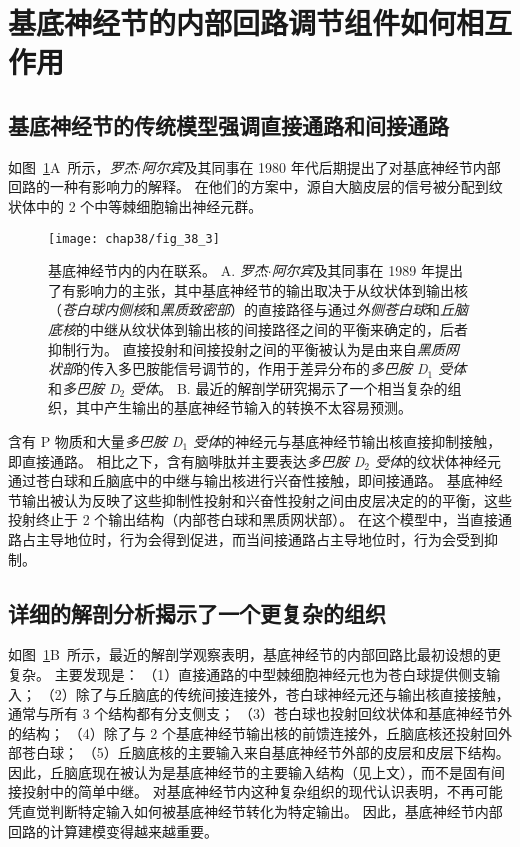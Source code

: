 \section{基底神经节的内部回路调节组件如何相互作用}

\subsection{基底神经节的传统模型强调直接通路和间接通路}

如图~\ref{fig:38_3}A~所示，\textit{罗杰$\cdot$阿尔宾}及其同事在 1980 年代后期提出了对基底神经节内部回路的一种有影响力的解释。
在他们的方案中，源自大脑皮层的信号被分配到纹状体中的 2 个中等棘细胞输出神经元群。


\begin{figure}[htbp]
	\centering
	\texttt{[image: chap38/fig\_38\_3]}
	\caption{基底神经节内的内在联系。
		A. \textit{罗杰$\cdot$阿尔宾}及其同事在 1989 年提出了有影响力的主张，其中基底神经节的输出取决于从纹状体到输出核（\textit{苍白球内侧核}和\textit{黑质致密部}）的直接路径与通过\textit{外侧苍白球}和\textit{丘脑底核}的中继从纹状体到输出核的间接路径之间的平衡来确定的，后者抑制行为。
		直接投射和间接投射之间的平衡被认为是由来自\textit{黑质网状部}的传入多巴胺能信号调节的，作用于差异分布的\textit{多巴胺 D$_1$ 受体}和\textit{多巴胺 D$_2$ 受体}。
		B. 最近的解剖学研究揭示了一个相当复杂的组织，其中产生输出的基底神经节输入的转换不太容易预测。}
	\label{fig:38_3}
\end{figure}


含有 P 物质和大量\textit{多巴胺 D$_1$ 受体}的神经元与基底神经节输出核直接抑制接触，即直接通路。
相比之下，含有脑啡肽并主要表达\textit{多巴胺 D$_2$ 受体}的纹状体神经元通过苍白球和丘脑底中的中继与输出核进行兴奋性接触，即间接通路。
基底神经节输出被认为反映了这些抑制性投射和兴奋性投射之间由皮层决定的的平衡，这些投射终止于 2 个输出结构（内部苍白球和黑质网状部）。
在这个模型中，当直接通路占主导地位时，行为会得到促进，而当间接通路占主导地位时，行为会受到抑制。



\subsection{详细的解剖分析揭示了一个更复杂的组织}

如图~\ref{fig:38_3}B~所示，最近的解剖学观察表明，基底神经节的内部回路比最初设想的更复杂。
主要发现是：
（1）直接通路的中型棘细胞神经元也为苍白球提供侧支输入； 
（2）除了与丘脑底的传统间接连接外，苍白球神经元还与输出核直接接触，通常与所有 3 个结构都有分支侧支；
（3）苍白球也投射回纹状体和基底神经节外的结构；
（4）除了与 2 个基底神经节输出核的前馈连接外，丘脑底核还投射回外部苍白球；
（5）丘脑底核的主要输入来自基底神经节外部的皮层和皮层下结构。
因此，丘脑底现在被认为是基底神经节的主要输入结构（见上文），而不是固有间接投射中的简单中继。
对基底神经节内这种复杂组织的现代认识表明，不再可能凭直觉判断特定输入如何被基底神经节转化为特定输出。
因此，基底神经节内部回路的计算建模变得越来越重要。


